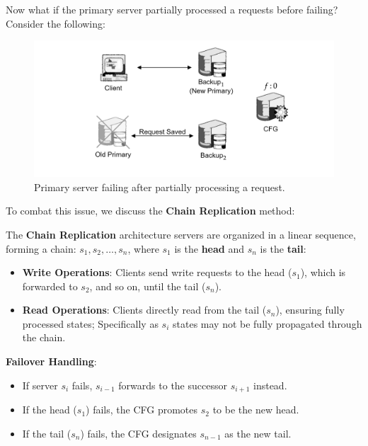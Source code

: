 \noindent
Now what if the primary server partially processed a requests before failing? Consider the following:
\begin{figure}[h]
    \centering
    \includegraphics[width=1\textwidth]{Sections/rep/old.png}
    \caption{Primary server failing after partially processing a request.}
\end{figure}

\noindent
To combat this issue, we discuss the \textbf{Chain Replication} method:
\begin{Def}

    The \textbf{Chain Replication} architecture servers are organized in a linear sequence, forming a chain: $s_1, s_2, \ldots, s_n$, where $s_1$ is the \textbf{head} and $s_n$ is the \textbf{tail}:
    \begin{itemize}
        \item \textbf{Write Operations}: Clients send write requests to the head ($s_1$), which is forwarded to $s_2$, and so on, until the tail ($s_n$).
        \item \textbf{Read Operations}: Clients directly read from the tail ($s_n$), ensuring fully processed states; Specifically as $s_i$ states may not be fully propagated through the chain.
    \end{itemize}

    \noindent
    \textbf{Failover Handling}:
    \begin{itemize}
        \item If server $s_i$ fails, $s_{i-1}$ forwards to the successor $s_{i+1}$ instead.
        
        \item If the head ($s_1$) fails, the CFG promotes $s_2$ to be the new head.
    
        \item If the tail ($s_n$) fails, the CFG designates $s_{n-1}$ as the new tail.
    \end{itemize}

\end{Def}

